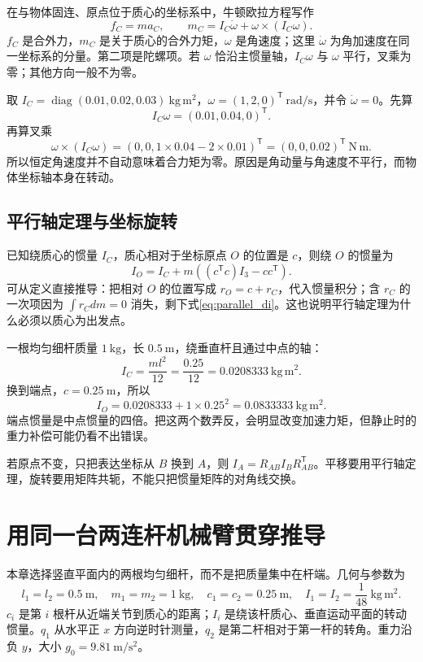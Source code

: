 在与物体固连、原点位于质心的坐标系中，牛顿欧拉方程写作
\begin{equation}
 f_C=m a_C,\qquad m_C=I_C\dot\omega+\omega\times(I_C\omega).
\end{equation}
$f_C$ 是合外力，$m_C$ 是关于质心的合外力矩，$\omega$ 是角速度；这里 $\dot\omega$ 为角加速度在同一坐标系的分量。第二项是陀螺项。若 $\omega$ 恰沿主惯量轴，$I_C\omega$ 与 $\omega$ 平行，叉乘为零；其他方向一般不为零。

\begin{examplebox}[算例 6A 陀螺力矩可以在角速度恒定时存在]
取 $I_C=\operatorname{diag}(0.01,0.02,0.03)\ \mathrm{kg\,m^2}$，$\omega=(1,2,0)^{\mathsf T}\ \mathrm{rad/s}$，并令 $\dot\omega=0$。先算
\[
 I_C\omega=(0.01,0.04,0)^{\mathsf T}.
\]
再算叉乘
\[
 \omega\times(I_C\omega)=(0,0,1\times0.04-2\times0.01)^{\mathsf T}=(0,0,0.02)^{\mathsf T}\ \mathrm{N\,m}.
\]
所以恒定角速度并不自动意味着合力矩为零。原因是角动量与角速度不平行，而物体坐标轴本身在转动。
\end{examplebox}

\subsection{平行轴定理与坐标旋转}
已知绕质心的惯量 $I_C$，质心相对于坐标原点 $O$ 的位置是 $c$，则绕 $O$ 的惯量为
\begin{equation}\label{eq:parallel_di}
 I_O=I_C+m\left((c^{\mathsf T}c)I_3-cc^{\mathsf T}\right).
\end{equation}
可从定义直接推导：把相对 $O$ 的位置写成 $r_O=c+r_C$，代入惯量积分；含 $r_C$ 的一次项因为 $\int r_Cdm=0$ 消失，剩下式\eqref{eq:parallel_di}。这也说明平行轴定理为什么必须以质心为出发点。

\begin{examplebox}[算例 6B 半米均匀杆的惯量]
一根均匀细杆质量 $1\ \mathrm{kg}$，长 $0.5\ \mathrm m$，绕垂直杆且通过中点的轴：
\[
 I_C=\frac{ml^2}{12}=\frac{0.25}{12}=0.0208333\ \mathrm{kg\,m^2}.
\]
换到端点，$c=0.25\ \mathrm m$，所以
\[
 I_O=0.0208333+1\times0.25^2=0.0833333\ \mathrm{kg\,m^2}.
\]
端点惯量是中点惯量的四倍。把这两个数弄反，会明显改变加速力矩，但静止时的重力补偿可能仍看不出错误。
\end{examplebox}

若原点不变，只把表达坐标从 $B$ 换到 $A$，则 $I_A=R_{AB}I_BR_{AB}^{\mathsf T}$。平移要用平行轴定理，旋转要用矩阵共轭，不能只把惯量矩阵的对角线交换。

\section{用同一台两连杆机械臂贯穿推导}
本章选择竖直平面内的两根均匀细杆，而不是把质量集中在杆端。几何与参数为
\[
 l_1=l_2=0.5\ \mathrm m,\quad m_1=m_2=1\ \mathrm{kg},\quad
 c_1=c_2=0.25\ \mathrm m,\quad I_1=I_2=\frac1{48}\ \mathrm{kg\,m^2}.
\]
$c_i$ 是第 $i$ 根杆从近端关节到质心的距离；$I_i$ 是绕该杆质心、垂直运动平面的转动惯量。$q_1$ 从水平正 $x$ 方向逆时针测量，$q_2$ 是第二杆相对于第一杆的转角。重力沿负 $y$，大小 $g_0=9.81\ \mathrm{m/s^2}$。

